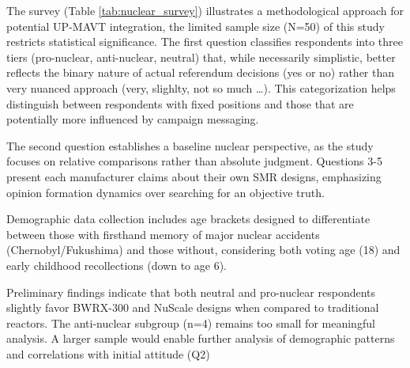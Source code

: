 \label{sec:appendix_survey}
The survey (Table \ref{tab:nuclear_survey}) illustrates a methodological approach for potential UP-MAVT integration, the limited sample size (N=50) of this study restricts statistical significance. The first question classifies respondents into three tiers (pro-nuclear, anti-nuclear, neutral) that, while necessarily simplistic, better reflects the binary nature of actual referendum decisions (yes or no) rather than very nuanced approach (very, slighlty, not so much \dots). This categorization helps distinguish between respondents with fixed positions and those that are potentially more influenced by campaign messaging.

The second question establishes a baseline nuclear perspective, as the study focuses on relative comparisons rather than absolute judgment. Questions 3-5 present each manufacturer claims about their own SMR designs, emphasizing opinion formation dynamics over searching for an objective truth.

Demographic data collection includes age brackets designed to differentiate between those with firsthand memory of major nuclear accidents (Chernobyl/Fukushima) and those without, considering both voting age (18) and early childhood recollections (down to age 6).

Preliminary findings indicate that both neutral and pro-nuclear respondents slightly favor BWRX-300 and NuScale designs when compared to traditional reactors. The anti-nuclear subgroup (n=4) remains too small for meaningful analysis. A larger sample would enable further analysis of demographic patterns and correlations with initial attitude (Q2)

